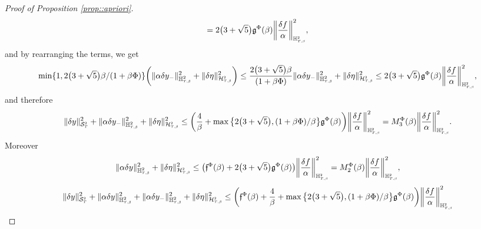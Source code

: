 \documentclass[10pt]{article} %
\newcommand\cH{\mathcal H}
\newcommand\cS{\mathcal S}
\newcommand{\smalltext}[1]{\text{\fontsize{4}{4}\selectfont$#1$}}
\newcommand\ff{\mathfrak f}
\newcommand\fg{\mathfrak g}
\def \H{\mathbb{H}}
\newcommand{\etaconst}{2\big(3 + \sqrt{5}\big)}
\begin{document}
\begin{proof}[Proof of Proposition \ref{prop::apriori}]
\begin{equation*}
	= \etaconst \fg^\Phi(\beta)\bigg\| \frac{\delta f}{\alpha} \bigg\|^2_{\H^{\smalltext{2}}_{\smalltext{T}\smalltext{,}\smalltext{\beta}}},
\end{equation*}
and by rearranging the terms, we get
\begin{equation*}
	\min\{1,\etaconst\beta/(1+\beta\Phi)\} \bigg(\|\alpha \delta y_-\|^2_{\H^2_{\smalltext{T}\smalltext{,}\smalltext{\beta}}} +\|\delta\eta\|^2_{\cH^\smalltext{2}_{\smalltext{T}\smalltext{,}\smalltext{\beta}}}\bigg) \leq \frac{\etaconst\beta}{(1+\beta\Phi)} \|\alpha \delta y_-\|^2_{\H^2_{\smalltext{T}\smalltext{,}\smalltext{\beta}}} +\|\delta\eta\|^2_{\cH^\smalltext{2}_{\smalltext{T}\smalltext{,}\smalltext{\beta}}} \leq \etaconst \fg^\Phi(\beta)  \bigg\| \frac{\delta f}{\alpha} \bigg\|^2_{\H^{\smalltext{2}}_{\smalltext{T}\smalltext{,}\smalltext{\beta}}},
\end{equation*}
and therefore
\begin{equation*}
	\|\delta y\|^2_{\cS^\smalltext{2}_\smalltext{T}} + \|\alpha \delta y_-\|^2_{\H^2_{\smalltext{T}\smalltext{,}\smalltext{\beta}}} +\|\delta\eta\|^2_{\cH^\smalltext{2}_{\smalltext{T}\smalltext{,}\smalltext{\beta}}} 
	\leq \bigg(\frac{4}{\beta} + \max\big\{\etaconst,(1+\beta\Phi)/\beta\big\}\fg^\Phi(\beta)\bigg)  \bigg\| \frac{\delta f}{\alpha} \bigg\|^2_{\H^{\smalltext{2}}_{\smalltext{T}\smalltext{,}\smalltext{\beta}}} 
	= M^\Phi_3(\beta)\bigg\| \frac{\delta f}{\alpha} \bigg\|^2_{\H^{\smalltext{2}}_{\smalltext{T}\smalltext{,}\smalltext{\beta}}}.
\end{equation*}
Moreover
\begin{equation*}
	\|\alpha \delta y\|^2_{\H^2_{\smalltext{T}\smalltext{,}\smalltext{\beta}}} + \|\delta\eta\|^2_{\cH^\smalltext{2}_{\smalltext{T}\smalltext{,}\smalltext{\beta}}}
	\leq \big(\ff^\Phi(\beta) + \etaconst\fg^\Phi(\beta)\big) \bigg\| \frac{\delta f}{\alpha} \bigg\|^2_{\H^{\smalltext{2}}_{\smalltext{T}\smalltext{,}\smalltext{\beta}}} 
	= M^\Phi_2(\beta)\bigg\| \frac{\delta f}{\alpha} \bigg\|^2_{\H^{\smalltext{2}}_{\smalltext{T}\smalltext{,}\smalltext{\beta}}},
\end{equation*}
\begin{equation*}
	\|\delta y\|^2_{\cS^\smalltext{2}_\smalltext{T}} + \|\alpha \delta y\|^2_{\H^2_{\smalltext{T}\smalltext{,}\smalltext{\beta}}} + \|\alpha \delta y_-\|^2_{\H^2_{\smalltext{T}\smalltext{,}\smalltext{\beta}}} + \|\delta\eta\|^2_{\cH^\smalltext{2}_{\smalltext{T}\smalltext{,}\smalltext{\beta}}}
	\leq \bigg(\ff^\Phi(\beta) + \frac{4}{\beta} + \max\big\{\etaconst,(1+\beta\Phi)/\beta\big\}\fg^\Phi(\beta)\bigg) \bigg\| \frac{\delta f}{\alpha} \bigg\|^2_{\H^{\smalltext{2}}_{\smalltext{T}\smalltext{,}\smalltext{\beta}}} 

\end{equation*}
\end{proof}
\end{document}
